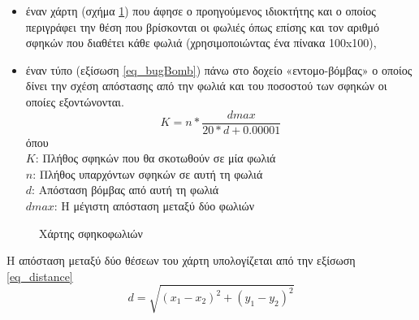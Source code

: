 \begin{itemize}
  \item  έναν χάρτη (σχήμα \ref{fig_waspNestsMap}) που άφησε ο προηγούμενος ιδιοκτήτης και ο οποίος περιγράφει την θέση που βρίσκονται οι φωλιές όπως επίσης και τον αριθμό σφηκών που διαθέτει κάθε φωλιά (χρησιμοποιώντας ένα πίνακα 100x100),
  \item έναν τύπο (εξίσωση \ref{eq_bugBomb}) πάνω στο δοχείο «εντομο-βόμβας» ο οποίος δίνει την σχέση απόστασης από την φωλιά και του ποσοστού των σφηκών οι οποίες εξοντώνονται.
      \begin{equation}\label{eq_bugBomb}
        K = n* \frac{dmax}{20*d+0.00001}
      \end{equation}
      όπου\\
      $K$: Πλήθος σφηκών που θα σκοτωθούν σε μία φωλιά\\
      $n$: Πλήθος υπαρχόντων σφηκών σε αυτή τη φωλιά\\
      $d$: Απόσταση βόμβας από αυτή τη φωλιά\\
      $dmax$: Η μέγιστη απόσταση μεταξύ δύο φωλιών\\
\end{itemize}

\begin{figure}[!t]
    \centering
    \caption{Χάρτης σφηκοφωλιών}
    \label{fig_waspNestsMap}
\end{figure}

Η απόσταση μεταξύ δύο θέσεων του χάρτη υπολογίζεται από την εξίσωση \ref{eq_distance}
\begin{equation}\label{eq_distance}
    d = \sqrt{(x_{1}-x_{2})^2+(y_{1}-y_{2})^2}
\end{equation}

